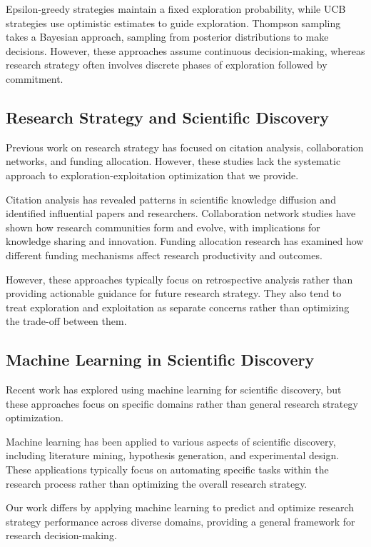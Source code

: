 \documentclass[letterpaper]{article}
\begin{document}
Epsilon-greedy strategies maintain a fixed exploration probability, while UCB strategies use optimistic estimates to guide exploration. Thompson sampling takes a Bayesian approach, sampling from posterior distributions to make decisions. However, these approaches assume continuous decision-making, whereas research strategy often involves discrete phases of exploration followed by commitment.

\subsection{Research Strategy and Scientific Discovery}

Previous work on research strategy has focused on citation analysis, collaboration networks, and funding allocation. However, these studies lack the systematic approach to exploration-exploitation optimization that we provide.

Citation analysis has revealed patterns in scientific knowledge diffusion and identified influential papers and researchers. Collaboration network studies have shown how research communities form and evolve, with implications for knowledge sharing and innovation. Funding allocation research has examined how different funding mechanisms affect research productivity and outcomes.

However, these approaches typically focus on retrospective analysis rather than providing actionable guidance for future research strategy. They also tend to treat exploration and exploitation as separate concerns rather than optimizing the trade-off between them.

\subsection{Machine Learning in Scientific Discovery}

Recent work has explored using machine learning for scientific discovery, but these approaches focus on specific domains rather than general research strategy optimization.

Machine learning has been applied to various aspects of scientific discovery, including literature mining, hypothesis generation, and experimental design. These applications typically focus on automating specific tasks within the research process rather than optimizing the overall research strategy.

Our work differs by applying machine learning to predict and optimize research strategy performance across diverse domains, providing a general framework for research decision-making.
\end{document}
